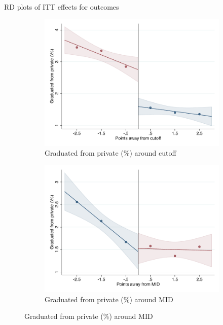 \documentclass[notes,11pt, aspectratio=169]{beamer}
\begin{document}
\begin{frame}{RD plots of ITT effects for outcomes}
\hyperlink{ITT_rd_plot_IPN}{}
\begin{figure}

    \begin{subfigure}{0.45\textwidth}
        \centering
        \caption{Graduated from private (\%) around cutoff}
        \includegraphics[width=\textwidth]{04_Figures/rd_plot_tau_ENLACE_Privado_Un_IPN3.pdf}
    \end{subfigure}
    \begin{subfigure}{0.45\textwidth}
        \centering
        \caption{Graduated from private (\%) around MID}
        \includegraphics[width=\textwidth]{04_Figures/rd_plot_mid_ENLACE_Privado_Un_IPN3.pdf}
    \end{subfigure}
    
\end{figure}
\end{frame}
\end{document}
